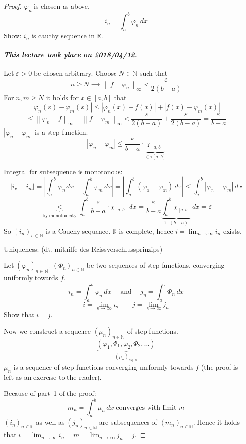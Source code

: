 \documentclass{article}
\newcommand{\norm}[1]{\left\|#1\right\|}
\newcommand{\card}[1]{\left|#1\right|}
\newcommand{\dateref}[1]{\paragraph{\textit{This lecture took place on #1.}}}
\begin{document}
\begin{proof}
  $\varphi_n$ is chosen as above.
  \[ i_n = \int_a^b \varphi_n \, dx \]
  Show: $i_n$ is cauchy sequence in $\mathbb R$.

  \dateref{2018/04/12}

  Let $\varepsilon > 0$ be chosen arbitrary. Choose $N \in \mathbb N$ such that
  \[ n \geq N \implies \norm{f - \varphi_n}_{\infty} < \frac{\varepsilon}{2 (b - a)} \]
  For $n,m \geq N$ it holds for $x \in [a,b]$ that
  \[ \card{\varphi_n(x) - \varphi_m(x)} \leq \card{\varphi_n(x) - f(x)} + \card{f(x) - \varphi_m(x)} \]
  \[
    \leq \norm{\varphi_n - f}_\infty + \norm{f - \varphi_m}_{\infty}
    < \frac{\varepsilon}{2 (b - a)} + \frac{\varepsilon}{2 (b - a)} = \frac{\varepsilon}{b - a}
  \]
  $\card{\varphi_n - \varphi_m}$ is a step function.
  \[ \card{\varphi_n - \varphi_m} \leq \frac{\varepsilon}{b - a} \cdot \underbrace{\chi_{[a,b]}}_{\in \tau[a,b]} \]

  Integral for subsequence is monotonous:
  \[
    \card{i_n - i_m} = \card{\int_a^b \varphi_n \, dx - \int_a^b \varphi_m \, dx}
    = \card{\int_a^b (\varphi_n - \varphi_m) \, dx} \leq \int_a^b \card{\varphi_n - \varphi_m} \, dx
  \] \[
    \underbrace{<}_{\text{by monotonicity}}
    \int_a^b \frac{\varepsilon}{b - a} \cdot \chi_{[a,b]} \, dx
    = \frac{\varepsilon}{b - a} \underbrace{\int_a^b \chi_{[a,b]}}_{1 \cdot (b - a)} \, dx
    = \varepsilon
  \]
  So $(i_n)_{n \in \mathbb N}$ is a Cauchy sequence.
  $\mathbb R$ is complete, hence $i = \lim_{n\to\infty} i_n$ exists.

  Uniqueness: (dt. \foreignlanguage{german}{mithilfe des Reissverschlussprinzips})

  Let $(\varphi_n)_{n \in \mathbb N}$, $(\Phi_n)_{n \in \mathbb N}$ be two sequences of step functions,
  converging uniformly towards $f$.
  \[
    i_n = \int_a^b \varphi_n \, dx \quad \text{ and } \quad j_n = \int_a^b \Phi_n \, dx
  \] \[
    i = \lim_{n\to\infty} i_n \qquad j = \lim_{n\to\infty} j_n
  \]
  Show that $i = j$.

  Now we construct a sequence $(\mu_n)_{n \in \mathbb N}$ of step functions.
  \[ \underbrace{(\varphi_1, \Phi_1, \varphi_2, \Phi_2, \dots)}_{(\mu_n)_{n \in \mathbb N}} \]
  $\mu_n$ is a sequence of step functions converging uniformly towards $f$ (the proof is left as an exercise to the reader).

  Because of part~1 of the proof:
  \[ m_n = \int_a^b \mu_n \, dx \text{ converges with limit } m \]
  $(i_n)_{n\in\mathbb N}$ as well as $(j_n)_{n \in \mathbb N}$ are subsequences of $(m_n)_{n \in \mathbb N}$.
  Hence it holds that $i = \lim_{n\to\infty} i_n = m = \lim_{n\to\infty} j_n = j$.
\end{proof}
\end{document}
